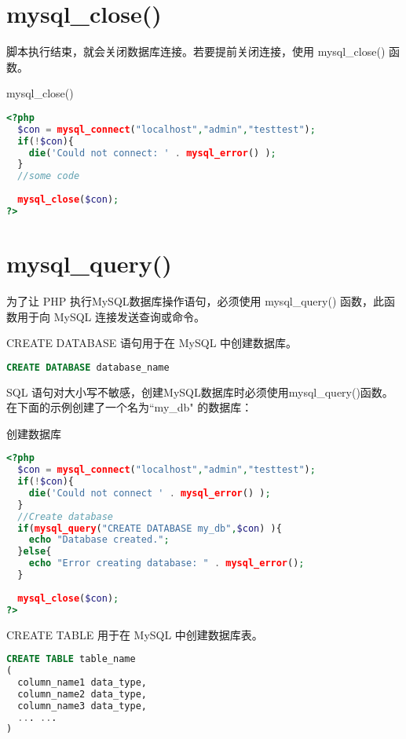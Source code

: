 \section{mysql\_close()}

脚本执行结束，就会关闭数据库连接。若要提前关闭连接，使用 mysql\_close() 函数。


\begin{example}
mysql\_close()
\begin{lstlisting}[language=PHP]
<?php
  $con = mysql_connect("localhost","admin","testtest");
  if(!$con){
    die('Could not connect: ' . mysql_error() );
  }
  //some code
  
  mysql_close($con);
?>
\end{lstlisting}
\end{example}


\section{mysql\_query()}

为了让 PHP 执行MySQL数据库操作语句，必须使用 mysql\_query() 函数，此函数用于向 MySQL 连接发送查询或命令。

CREATE DATABASE 语句用于在 MySQL 中创建数据库。

\begin{lstlisting}[language=SQL]
CREATE DATABASE database_name
\end{lstlisting}



SQL 语句对大小写不敏感，创建MySQL数据库时必须使用mysql\_query()函数。在下面的示例创建了一个名为``my\_db" 的数据库：

\begin{example}
创建数据库
\begin{lstlisting}[language=PHP]
<?php
  $con = mysql_connect("localhost","admin","testtest");
  if(!$con){
    die('Could not connect ' . mysql_error() );
  }
  //Create database
  if(mysql_query("CREATE DATABASE my_db",$con) ){
    echo "Database created.";
  }else{
    echo "Error creating database: " . mysql_error();
  }
  
  mysql_close($con);
?>
\end{lstlisting}
\end{example}

CREATE TABLE 用于在 MySQL 中创建数据库表。

\begin{lstlisting}[language=SQL]
CREATE TABLE table_name
(
  column_name1 data_type,
  column_name2 data_type,
  column_name3 data_type,
  ... ...
)
\end{lstlisting}

